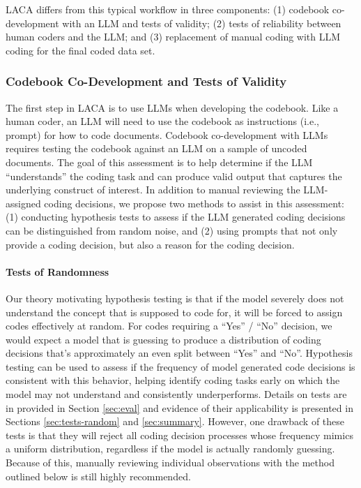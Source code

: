 \documentclass{article}
\begin{document}
LACA differs from this typical workflow in three components: (1) codebook co-development with an LLM and tests of validity; (2) tests of reliability between human coders and the LLM; and (3) replacement of manual coding with LLM coding for the final coded data set.

\subsubsection{Codebook Co-Development and Tests of Validity}
The first step in LACA is to use LLMs when developing the codebook.  Like a human coder, an LLM will need to use the codebook as instructions (i.e., prompt) for how to code documents. 
Codebook co-development with LLMs requires testing the codebook against an LLM on a sample of uncoded documents.  The goal of this assessment is to help determine if the LLM “understands” the coding task and can produce valid output that captures the underlying construct of interest.  In addition to manual reviewing the LLM-assigned coding decisions, we propose two methods to assist in this assessment: (1) conducting hypothesis tests to assess if the LLM generated coding decisions can be distinguished from random noise, and (2) using prompts that not only provide a coding decision, but also a reason for the coding decision. 

\paragraph{Tests of Randomness}
Our theory motivating hypothesis testing is that if the model severely does not understand the concept that is supposed to code for, it will be forced to assign codes effectively at random.  For codes requiring a “Yes” / “No” decision, we would expect a model that is guessing to produce a distribution of coding decisions that’s approximately an even split between “Yes” and “No”.  Hypothesis testing can be used to assess if the frequency of model generated code decisions is consistent with this behavior, helping identify coding tasks early on which the model may not understand and consistently underperforms. Details on tests are in provided in Section \ref{sec:eval} and evidence of their applicability is presented in Sections \ref{sec:tests-random} and \ref{sec:summary}.  However, one drawback of these tests is that they will reject all coding decision processes whose frequency mimics a uniform distribution, regardless if the model is actually randomly guessing.  Because of this, manually reviewing individual observations with the method outlined below is still highly recommended.
\end{document}
